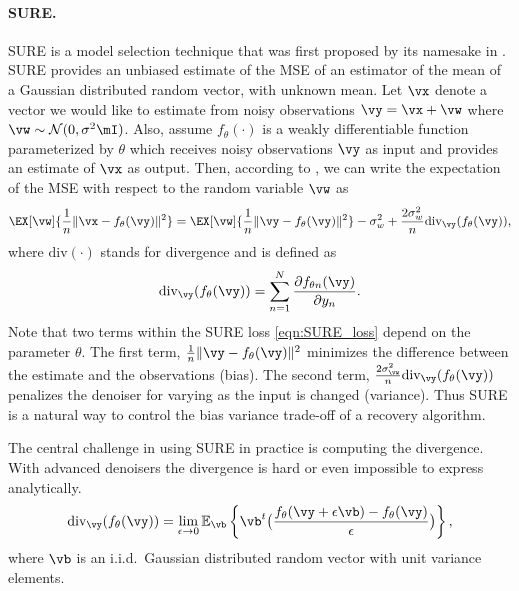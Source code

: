 \documentclass{article}
\newcommand\noise{\vw}
\begin{document}
\paragraph{SURE.}  SURE is a model selection technique that was first proposed by its namesake in \cite{SURE}. SURE provides an unbiased
estimate of the MSE of an estimator of the mean of a Gaussian distributed random vector, with unknown mean. 
Let $\vx$ denote a vector we would like to estimate from noisy observations $\vy=\vx+\vw$ where $\vw\sim \mathcal{N}(0,\sigma^2 \mI)$. Also, assume $f_\theta(\cdot)$ is a weakly differentiable function parameterized by $\theta$ which receives noisy observations $\vy$ as input and provides an estimate of $\vx$ as output. Then, according to \cite{SURE}, we can write the expectation of the MSE with respect to the random variable $\noise$ as
\begin{align}\label{eqn:SURE_loss}
    \EX[\vw]{ \frac{1}{n}\|\vx-f_\theta(\vy)\|^2}
    =
    \EX[\vw]{ \frac{1}{n}\|\vy-f_\theta (\vy)\|^2}
    -\sigma_w^2
    +\frac{2\sigma_w^2}{n}\text{div}_\vy(f_\theta (\vy)),
\end{align}
where $\text{div}(\cdot)$ stands for divergence and is defined as
\begin{align}
    \text{div}_\vy(f_\theta (\vy))=\sum_{n=1}^N \frac{\partial f_{\theta n}(\vy)}{\partial y_n}.
\end{align}Note that two terms within the SURE loss \eqref{eqn:SURE_loss} depend on the parameter $\theta$. The first term,  $\frac{1}{n}\|\vy-f_\theta (\vy)\|^2$ minimizes the difference between the estimate and the observations (bias). The second term, $\frac{2\sigma_\vw^2}{n}\text{div}_\vy(f_\theta (\vy))$ penalizes the denoiser for varying as the input is changed (variance). Thus SURE is a natural way to control the bias variance trade-off of a recovery algorithm.

The central challenge in using SURE in practice is computing the divergence. With advanced denoisers the divergence is hard or even impossible to express analytically.%
\begin{align}\label{eqn:MCdiv}
    \text{div}_\vy(f_\theta (\vy))=\lim_{\epsilon \rightarrow 0} \mathbb{E}_\vb \left\{ \vb^t \big( \frac{f_\theta(\vy+\epsilon \vb)-f_\theta(\vy)}{\epsilon} \big)\right\},
\end{align}
where $\vb$ is an i.i.d.~Gaussian distributed random vector with unit variance elements.
\end{document}
